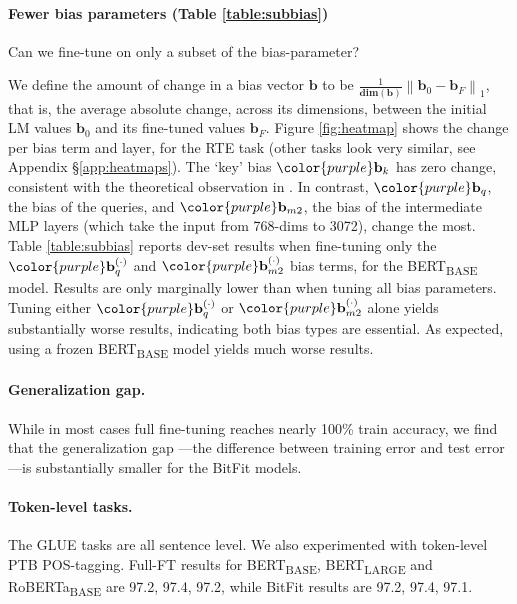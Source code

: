 \paragraph{Fewer bias parameters (Table \ref{table:subbias})}

Can we fine-tune on only a subset of the bias-parameter?

We define the amount of change in a bias vector $\mathbf{b}$ to be $\frac{1}{\mathbf{dim(b)}}\left\lVert\mathbf{b}_0 - \mathbf{b}_F\right\rVert_1$, that is, the average absolute change, across its dimensions, between the initial LM values $\mathbf{b}_0$ and its fine-tuned values $\mathbf{b}_F$. Figure \ref{fig:heatmap} shows the change per bias term and layer, for the RTE task (other tasks look very similar, see Appendix \S\ref{app:heatmaps}). The `key' bias $\color{purple}\textbf{b}_{k}$ has zero change, consistent with the theoretical observation in \citet{DBLP:journals/corr/abs-2006-16362}. In contrast,
$\color{purple}\textbf{b}_q$, the bias of the queries, and $\color{purple}\textbf{b}_{m2}$, the bias of the intermediate MLP layers (which take the input from 768-dims to 3072), change the most. Table \ref{table:subbias} reports dev-set results when fine-tuning only the
$\color{purple}\textbf{b}_q^{(\cdot)}$ and $\color{purple}\textbf{b}_{m2}^{(\cdot)}$ bias terms, for the BERT\textsubscript{BASE} model. Results are only marginally lower than when tuning all bias parameters. Tuning either $\color{purple}\textbf{b}_q^{(\cdot)}$ or $\color{purple}\textbf{b}_{m2}^{(\cdot)}$ alone yields substantially worse results, indicating both bias types are essential. As expected, using a frozen BERT\textsubscript{BASE} model yields much worse results. 

\paragraph{Generalization gap.} While in most cases full fine-tuning reaches nearly 100\% train accuracy, we find that the generalization gap \cite{shalev2014understanding}---the difference between training error and test error---is substantially smaller for the BitFit models.

\paragraph{Token-level tasks.} The GLUE tasks are all sentence level. We also experimented with token-level PTB POS-tagging. Full-FT results for BERT\textsubscript{BASE}, BERT\textsubscript{LARGE} and RoBERTa\textsubscript{BASE} are 97.2, 97.4, 97.2, while BitFit results are 97.2, 97.4, 97.1.
